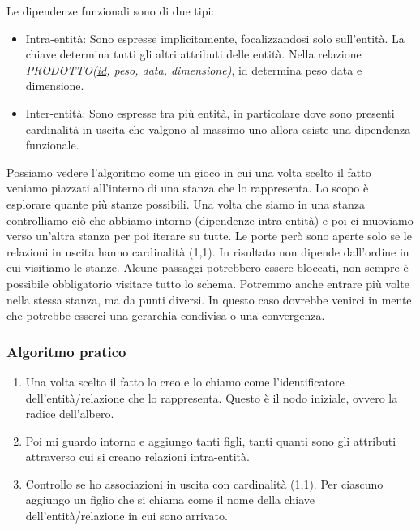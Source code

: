 Le dipendenze funzionali sono di due tipi:
\begin{itemize}
	\item Intra-entità: Sono espresse implicitamente, focalizzandosi solo sull'entità. La chiave determina tutti gli altri attributi delle entità. Nella relazione \textit{PRODOTTO(\underline{id}, peso, data, dimensione)}, id determina peso data e dimensione.
	\item Inter-entità: Sono espresse tra più entità, in particolare dove sono presenti cardinalità in uscita che valgono al massimo uno allora esiste una dipendenza funzionale.
\end{itemize}
\begin{info}
	Possiamo vedere l'algoritmo come un gioco in cui una volta scelto il fatto veniamo piazzati all'interno di una stanza che lo rappresenta. Lo scopo è esplorare quante più stanze possibili. Una volta che siamo in una stanza controlliamo ciò che abbiamo intorno (dipendenze intra-entità) e poi ci muoviamo verso un'altra stanza per poi iterare su tutte. Le porte però sono aperte solo se le relazioni in uscita hanno cardinalità (1,1). In risultato non dipende dall'ordine in cui visitiamo le stanze. Alcune passaggi potrebbero essere bloccati, non sempre è possibile obbligatorio visitare tutto lo schema. Potremmo anche entrare più volte nella stessa stanza, ma da punti diversi. In questo caso dovrebbe venirci in mente che potrebbe esserci una gerarchia condivisa o una convergenza.
\end{info}

\subsubsection{Algoritmo pratico}
\begin{enumerate}
	\item Una volta scelto il fatto lo creo e lo chiamo come l'identificatore dell'entità/relazione che lo rappresenta. Questo è il nodo iniziale, ovvero la radice dell'albero.
	\item Poi mi guardo intorno e aggiungo tanti figli, tanti quanti sono gli attributi attraverso cui si creano relazioni intra-entità.
	\item Controllo se ho associazioni in uscita con cardinalità (1,1). Per ciascuno aggiungo un figlio che si chiama come il nome della chiave dell'entità/relazione in cui sono arrivato.
\end{enumerate}


